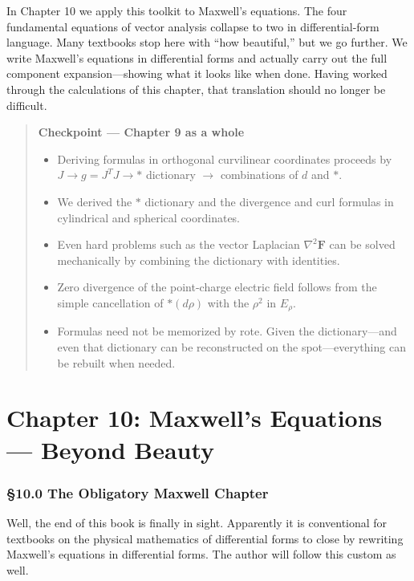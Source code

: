 In Chapter 10 we apply this toolkit to Maxwell's equations. The four
fundamental equations of vector analysis collapse to two in
differential-form language. Many textbooks stop here with ``how
beautiful,'' but we go further. We write Maxwell's equations in
differential forms and actually carry out the full component
expansion---showing what it looks like when done. Having worked through
the calculations of this chapter, that translation should no longer be
difficult.

\begin{quote}
\textbf{Checkpoint — Chapter 9 as a whole}

\begin{itemize}
\item
  Deriving formulas in orthogonal curvilinear coordinates proceeds by
  \(J \to g = J^T J \to \ast\) dictionary \(\to\) combinations of \(d\)
  and \(\ast\).
\item
  We derived the \(\ast\) dictionary and the divergence and curl
  formulas in cylindrical and spherical coordinates.
\item
  Even hard problems such as the vector Laplacian \(\nabla^2\mathbf{F}\)
  can be solved mechanically by combining the dictionary with
  identities.
\item
  Zero divergence of the point-charge electric field follows from the
  simple cancellation of \(\ast(d\rho)\) with the \(\rho^2\) in
  \(E_\rho\).
\item
  Formulas need not be memorized by rote. Given the dictionary---and
  even that dictionary can be reconstructed on the spot---everything can
  be rebuilt when needed.
\end{itemize}
\end{quote}

\newpage

\hypertarget{chapter-10-maxwells-equations-beyond-beauty}{%
\chapter{Chapter 10: Maxwell's Equations --- Beyond
Beauty}\label{chapter-10-maxwells-equations-beyond-beauty}}

\hypertarget{the-obligatory-maxwell-chapter}{%
\subsection{§10.0 The Obligatory Maxwell
Chapter}\label{the-obligatory-maxwell-chapter}}

Well, the end of this book is finally in sight. Apparently it is
conventional for textbooks on the physical mathematics of differential
forms to close by rewriting Maxwell's equations in differential forms.
The author will follow this custom as well.

